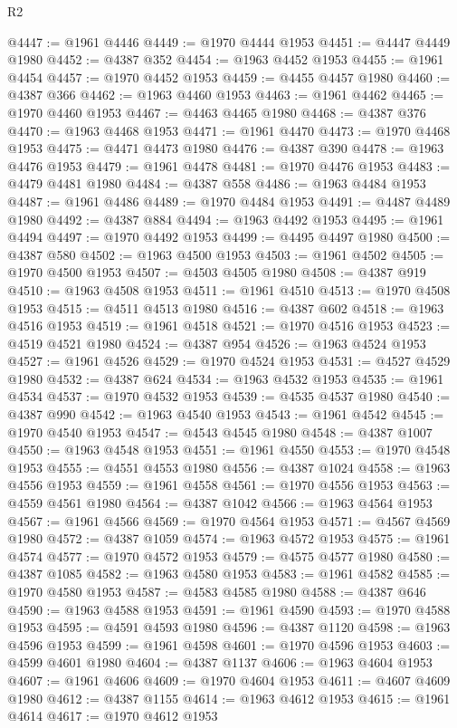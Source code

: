 \begin{lexlean}{R2}
\begin{coremodule}
@4447 := @1961 @4446
@4449 := @1970 @4444 @1953
@4451 := @4447 @4449 @1980
@4452 := @4387 @352
@4454 := @1963 @4452 @1953
@4455 := @1961 @4454
@4457 := @1970 @4452 @1953
@4459 := @4455 @4457 @1980
@4460 := @4387 @366
@4462 := @1963 @4460 @1953
@4463 := @1961 @4462
@4465 := @1970 @4460 @1953
@4467 := @4463 @4465 @1980
@4468 := @4387 @376
@4470 := @1963 @4468 @1953
@4471 := @1961 @4470
@4473 := @1970 @4468 @1953
@4475 := @4471 @4473 @1980
@4476 := @4387 @390
@4478 := @1963 @4476 @1953
@4479 := @1961 @4478
@4481 := @1970 @4476 @1953
@4483 := @4479 @4481 @1980
@4484 := @4387 @558
@4486 := @1963 @4484 @1953
@4487 := @1961 @4486
@4489 := @1970 @4484 @1953
@4491 := @4487 @4489 @1980
@4492 := @4387 @884
@4494 := @1963 @4492 @1953
@4495 := @1961 @4494
@4497 := @1970 @4492 @1953
@4499 := @4495 @4497 @1980
@4500 := @4387 @580
@4502 := @1963 @4500 @1953
@4503 := @1961 @4502
@4505 := @1970 @4500 @1953
@4507 := @4503 @4505 @1980
@4508 := @4387 @919
@4510 := @1963 @4508 @1953
@4511 := @1961 @4510
@4513 := @1970 @4508 @1953
@4515 := @4511 @4513 @1980
@4516 := @4387 @602
@4518 := @1963 @4516 @1953
@4519 := @1961 @4518
@4521 := @1970 @4516 @1953
@4523 := @4519 @4521 @1980
@4524 := @4387 @954
@4526 := @1963 @4524 @1953
@4527 := @1961 @4526
@4529 := @1970 @4524 @1953
@4531 := @4527 @4529 @1980
@4532 := @4387 @624
@4534 := @1963 @4532 @1953
@4535 := @1961 @4534
@4537 := @1970 @4532 @1953
@4539 := @4535 @4537 @1980
@4540 := @4387 @990
@4542 := @1963 @4540 @1953
@4543 := @1961 @4542
@4545 := @1970 @4540 @1953
@4547 := @4543 @4545 @1980
@4548 := @4387 @1007
@4550 := @1963 @4548 @1953
@4551 := @1961 @4550
@4553 := @1970 @4548 @1953
@4555 := @4551 @4553 @1980
@4556 := @4387 @1024
@4558 := @1963 @4556 @1953
@4559 := @1961 @4558
@4561 := @1970 @4556 @1953
@4563 := @4559 @4561 @1980
@4564 := @4387 @1042
@4566 := @1963 @4564 @1953
@4567 := @1961 @4566
@4569 := @1970 @4564 @1953
@4571 := @4567 @4569 @1980
@4572 := @4387 @1059
@4574 := @1963 @4572 @1953
@4575 := @1961 @4574
@4577 := @1970 @4572 @1953
@4579 := @4575 @4577 @1980
@4580 := @4387 @1085
@4582 := @1963 @4580 @1953
@4583 := @1961 @4582
@4585 := @1970 @4580 @1953
@4587 := @4583 @4585 @1980
@4588 := @4387 @646
@4590 := @1963 @4588 @1953
@4591 := @1961 @4590
@4593 := @1970 @4588 @1953
@4595 := @4591 @4593 @1980
@4596 := @4387 @1120
@4598 := @1963 @4596 @1953
@4599 := @1961 @4598
@4601 := @1970 @4596 @1953
@4603 := @4599 @4601 @1980
@4604 := @4387 @1137
@4606 := @1963 @4604 @1953
@4607 := @1961 @4606
@4609 := @1970 @4604 @1953
@4611 := @4607 @4609 @1980
@4612 := @4387 @1155
@4614 := @1963 @4612 @1953
@4615 := @1961 @4614
@4617 := @1970 @4612 @1953

\end{coremodule}
\end{lexlean}

